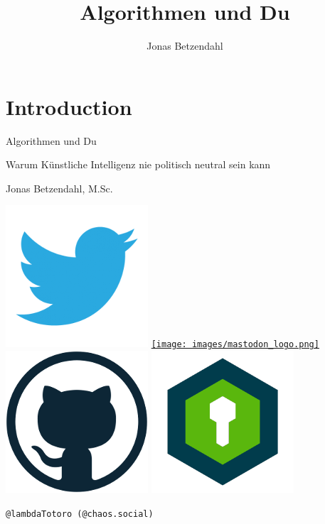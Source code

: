 \documentclass[aspectratio=43,x11names]{beamer}
\author{Jonas Betzendahl}
\title{Algorithmen und Du}
\begin{document}
\section{Introduction}

\begin{frame}
\begin{center}
\vfill
\huge Algorithmen und Du
\normalsize 
\smallskip
\smallskip

Warum Künstliche Intelligenz nie politisch neutral sein kann
\bigskip\bigskip

\large Jonas Betzendahl, M.Sc.
\bigskip\bigskip

\href{https://twitter.com/lambdatotoro}{\includegraphics[scale=0.125]{images/twitter_logo.png}}
\href{https://chaos.social/@lambdatotoro}{\texttt{[image: images/mastodon\_logo.png]}}
\href{https://github.com/lambdaTotoro}{\includegraphics[scale=0.125]{images/github_logo.png}}
\href{https://whispeer.de/en/user/jbetzend}{\includegraphics[scale=0.125]{images/whispeer_logo.png}}

\texttt{@lambdaTotoro (@chaos.social)}
\end{center}
\end{frame}
\end{document}
